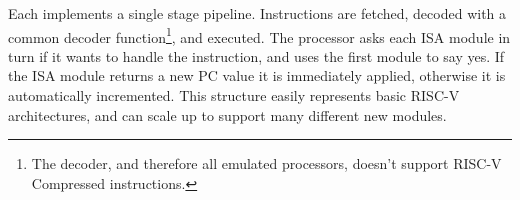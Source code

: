 \documentclass[../thesis]{subfiles}
\begin{document}
Each  implements a single stage pipeline.
Instructions are fetched, decoded with a common decoder function\footnote{The decoder, and therefore all emulated processors, doesn't support RISC-V Compressed instructions.}, and executed.
The processor asks each ISA module in turn if it wants to handle the instruction, and uses the first module to say yes.
If the ISA module returns a new PC value it is immediately applied, otherwise it is automatically incremented.
This structure easily represents basic RISC-V architectures, and can scale up to support many different new modules.






\end{document}
